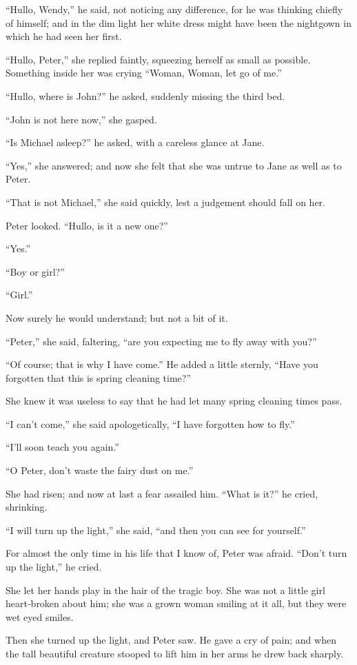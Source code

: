 “Hullo, Wendy,” he said, not noticing any difference,
for he was thinking chiefly of himself;
and in the dim light her white dress might have been the nightgown in which he had seen her first.

“Hullo, Peter,” she replied faintly, squeezing herself as small as possible.
Something inside her was crying “Woman, Woman, let go of me.”

“Hullo, where is John?\@” he asked, suddenly missing the third bed.

“John is not here now,” she gasped.

“Is Michael asleep?\@” he asked, with a careless glance at Jane.

“Yes,” she answered;
and now she felt that she was untrue to Jane as well as to Peter.

“That is not Michael,” she said quickly,
lest a judgement should fall on her.

Peter looked.
“Hullo, is it a new one?”

“Yes.”

“Boy or girl?”

“Girl.”

Now surely he would understand;
but not a bit of it.

“Peter,” she said, faltering, “are you expecting me to fly away with you?”

“Of course;
that is why I have come.”
He added a little sternly,
“Have you forgotten that this is spring cleaning time?”

She knew it was useless to say that he had let many spring cleaning times pass.

“I can’t come,” she said apologetically,
“I have forgotten how to fly.”

“I’ll soon teach you again.”

“O Peter, don’t waste the fairy dust on me.”

She had risen;
and now at last a fear assailed him.
“What is it?\@” he cried, shrinking.

“I will turn up the light,” she said, “and then you can see for yourself.”

For almost the only time in his life that I know of, Peter was afraid.
“Don’t turn up the light,” he cried.

She let her hands play in the hair of the tragic boy.
She was not a little girl heart‐broken about him;
she was a grown woman smiling at it all,
but they were wet eyed smiles.

Then she turned up the light, and Peter saw.
He gave a cry of pain;
and when the tall beautiful creature stooped to lift him in her arms he drew back sharply.

